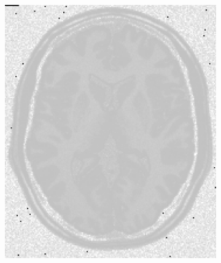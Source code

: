 \documentclass[letterpaper,12pt]{article}
\theoremstyle{plain}
\begin{document}
\begin{figure}[h]
\begin{subfigure}[h]{0.24\linewidth}
            \includegraphics[width=\textwidth]{Figuras/sustraction_exp_gamma=0.5.png}
        \end{subfigure}
                \caption{Diferencia entre la imagen original y la imagen transformada con $\gamma = 0.5$.}
                \label{fig:Exptrans0.5_sustraction}
        \begin{subfigure}[h]{0.24\linewidth}
            \centering

\end{subfigure}
\end{figure}
\end{document}
